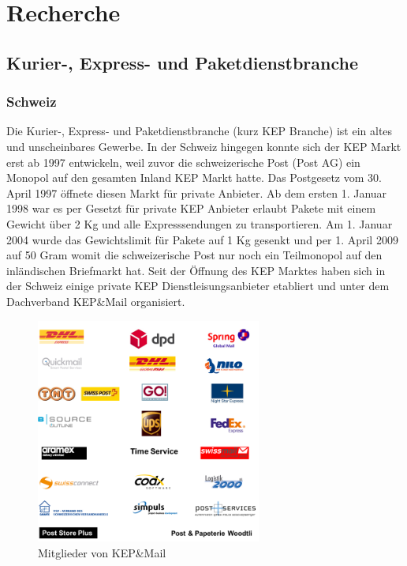 \chapter{Recherche}
\label{sec:recherche}

\section{Kurier-, Express- und Paketdienstbranche}
\subsection{Schweiz}
Die Kurier-, Express- und Paketdienstbranche (kurz KEP Branche) ist ein altes und unscheinbares Gewerbe. In der Schweiz hingegen konnte sich der KEP Markt erst ab 1997 entwickeln, weil zuvor die schweizerische Post (Post AG) ein Monopol auf den gesamten Inland KEP Markt hatte. Das Postgesetz vom 30. April 1997\citep[]{postgesetz.sr783} öffnete diesen Markt für private Anbieter. Ab dem ersten 1. Januar 1998 war es per Gesetzt für private KEP Anbieter erlaubt Pakete mit einem Gewicht über 2 Kg und alle Expresssendungen zu transportieren. Am 1. Januar 2004 wurde das Gewichtslimit für Pakete auf 1 Kg gesenkt und per 1. April 2009 auf 50 Gram womit die schweizerische Post nur noch ein Teilmonopol auf den inländischen Briefmarkt hat. Seit der Öffnung des KEP Marktes haben sich in der Schweiz einige private KEP Dienstleisungsanbieter etabliert und unter dem Dachverband KEP\&Mail organisiert.
\begin{figure}[ht]
	\centering
  \includegraphics[width=0.66\textwidth]{images/kepmailMitglieder.png}
	\caption{Mitglieder von KEP\&Mail}
	\label{fig1:kepmail}
\end{figure}


